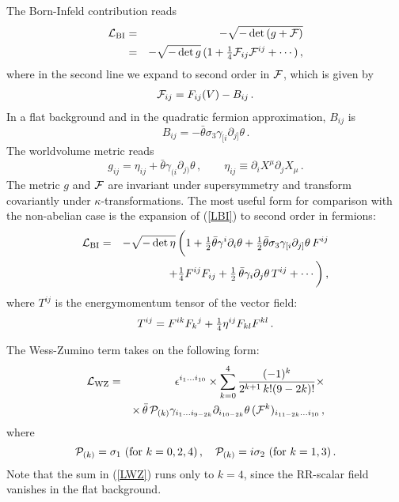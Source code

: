\documentclass[12pt,a4paper]{article}
\def\half{{\textstyle {1 \over 2}}}
\def\quart{{\textstyle {1 \over 4}}}
\def\noverm#1#2{{\textstyle {#1 \over #2}}}
\begin{document}
The Born-Infeld contribution reads
\begin{eqnarray}
{\cal L}_{\rm BI} &=& - \sqrt{-\det \,(g + {\cal F})}  \nonumber\\
     \label{LBI}
       &=& - \sqrt{-\det g}\,( 1+\noverm{1}{4} {\cal F}_{ij}{\cal F}^{ij}
        +\cdots)\,,
\end{eqnarray}
where in the second line we expand to second order in ${\cal F}$, which is
given by
\begin{eqnarray}
  {\cal F}_{ij} = F_{ij}(V) - B_{ij} \,.
\end{eqnarray}
In a flat background and in the quadratic fermion approximation,
 $B_{ij}$ is
\begin{equation}
\label{Bab}
  B_{ij} = - \bar\theta\sigma_3\gamma_{[i}\partial_{j]}\theta\,.
\end{equation}
The worldvolume metric reads
\begin{equation}
  g_{ij} = \eta_{ij} + \bar\theta \gamma_{(i}\partial_{j)}\theta\,,\qquad
  \eta_{ij} \equiv \partial_i X^\mu \partial_j X_\mu\,.
\label{geta}
\end{equation}
The metric $g$ and ${\cal F}$ are invariant under supersymmetry and transform
covariantly under $\kappa$-transformations.
The most useful form for comparison with the
non-abelian case is the expansion of (\ref{LBI})
to second order in fermions:
\begin{eqnarray}
\label{LBIquad}
    {\cal L}_{{\rm BI}} &=& -\sqrt{-\det\eta}\,\bigg(
    1 + \half\bar\theta\gamma^i\partial_i\theta +
         \half \bar\theta\sigma_3\gamma_{[i}\partial_{j]}\theta\, F^{ij}
  \nonumber\\
  &&\qquad  + \noverm{1}{4} F^{ij} F_{ij}
                 + \noverm{1}{2}\, \bar\theta\gamma_i\partial_j\theta\,T^{ij}
                   +\cdots\bigg)\,,
\end{eqnarray}
where $T^{ij}$ is the energymomentum tensor of the vector field:
\begin{equation}
   T^{ij} = F^{ik}F_{k}{}^j +\quart \eta^{ij} F_{kl}F^{kl}\,.
\end{equation}

The Wess-Zumino term takes on the following form:
\begin{eqnarray}
\label{LWZ}
  {\cal L}_{{\rm WZ}} &=&
   \epsilon^{i_1\ldots i_{10}} \times
   \sum_{k=0}^4   {(-1)^k\over 2^{k+1}\,k! (9-2k)!}
   \times
\nonumber\\
&& \times
  \,\bar\theta   \,
   {\cal P}_{(k)} \gamma_{i_1\ldots i_{9-2k}}\partial_{i_{10-2k}}\theta\,
    ({\cal F}^k)_{i_{11-2k}\ldots i_{10}}\,,
\end{eqnarray}
where
\begin{equation}
  {\cal P}_{(k)} =  \sigma_1\ ({\rm for}\ k=0,2,4)\,,
  \quad{\cal P}_{(k)} = i\sigma_2\ ({\rm for}\ k=1,3)\,.
\end{equation}
Note that the sum in (\ref{LWZ}) runs only to $k=4$, since the
RR-scalar field vanishes in the flat background.
\end{document}
